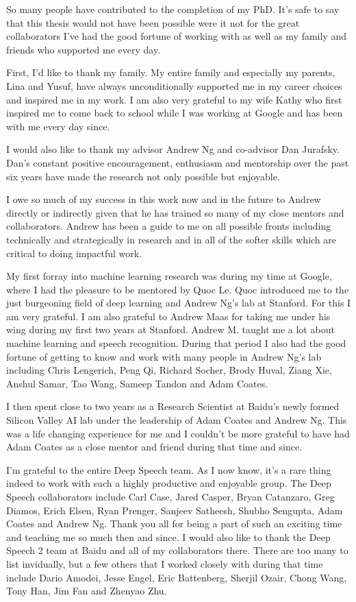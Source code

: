 

So many people have contributed to the completion of my PhD. It's safe to say
that this thesis would not have been possible were it not for the great
collaborators I've had the good fortune of working with as well as my family
and friends who supported me every day.

First, I'd like to thank my family. My entire family and especially my parents,
Lina and Yusuf, have always unconditionally supported me in my career choices
and inspired me in my work. I am also very grateful to my wife Kathy who first
inspired me to come back to school while I was working at Google and has been
with me every day since.

I would also like to thank my advisor Andrew Ng and co-advisor Dan Jurafsky.
Dan's constant positive encouragement, enthusiasm and mentorship over the past
six years have made the research not only possible but enjoyable.

I owe so much of my success in this work now and in the future to Andrew
directly or indirectly given that he has trained so many of my close mentors
and collaborators. Andrew has been a guide to me on all possible fronts
including technically and strategically in research and in all of the softer
skills which are critical to doing impactful work.

My first forray into machine learning research was during my time at Google,
where I had the pleasure to be mentored by Quoc Le. Quoc introduced me to the
just burgeoning field of deep learning and Andrew Ng's lab at Stanford. For
this I am very grateful. I am also grateful to Andrew Maas for taking me under
his wing during my first two years at Stanford. Andrew M. taught me a lot about
machine learning and speech recognition. During that period I also had the good
fortune of getting to know and work with many people in Andrew Ng's lab
including Chris Lengerich, Peng Qi, Richard Socher, Brody Huval, Ziang Xie,
Anshul Samar, Tao Wang, Sameep Tandon and Adam Coates.

I then spent close to two years as a Research Scientist at Baidu's newly formed
Silicon Valley AI lab under the leadership of Adam Coates and Andrew Ng. This
was a life changing experience for me and I couldn't be more grateful to have
had Adam Coates as a close mentor and friend during that time and since.

I'm grateful to the entire Deep Speech team. As I now know, it's a rare thing
indeed to work with such a highly productive and enjoyable group. The Deep
Speech collaborators include Carl Case, Jared Casper, Bryan Catanzaro, Greg
Diamos, Erich Elsen, Ryan Prenger, Sanjeev Satheesh, Shubho Sengupta, Adam
Coates and Andrew Ng. Thank you all for being a part of such an exciting time
and teaching me so much then and since. I would also like to thank the Deep
Speech 2 team at Baidu and all of my collaborators there. There are too many to
list invidually, but a few others that I worked closely with during that time
include Dario Amodei, Jesse Engel, Eric Battenberg, Sherjil Ozair, Chong Wang,
Tony Han, Jim Fan and Zhenyao Zhu.

